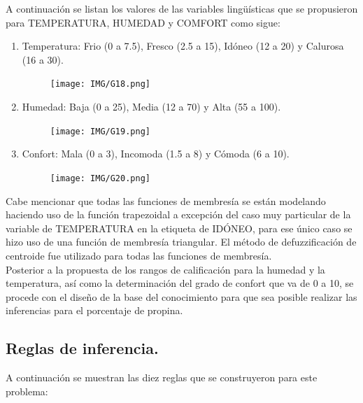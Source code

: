 \documentclass[11pt, letterpaper]{article}
\begin{document}
A continuación se listan los valores de las variables lingüísticas que se propusieron para TEMPERATURA, HUMEDAD y COMFORT como sigue:


\begin{enumerate}
	\item Temperatura: Frio (0 a 7.5), Fresco (2.5 a 15), Idóneo (12 a 20) y Calurosa (16 a 30).
	\begin{figure}[h]
		\centering
		\texttt{[image: IMG/G18.png]}
	\end{figure}
	
	\item Humedad: Baja (0 a 25), Media (12 a 70) y Alta (55 a 100).
	\begin{figure}[h]
		\centering
		\texttt{[image: IMG/G19.png]}
	\end{figure}
	\newpage
	\item Confort: Mala (0 a 3), Incomoda (1.5 a 8) y Cómoda (6 a 10).
	\begin{figure}[h]
		\centering
		\texttt{[image: IMG/G20.png]}
	\end{figure}
\end{enumerate}

Cabe mencionar que todas las funciones de membresía se están modelando haciendo uso de la función trapezoidal a excepción del caso muy particular de la variable de TEMPERATURA en la etiqueta de IDÓNEO, para ese único caso se hizo uso de una función de membresía triangular. El método de defuzzificación de centroide fue utilizado para todas las funciones de membresía. \\

Posterior a la propuesta de los rangos de calificación para la humedad y la temperatura, así como la determinación del grado de confort que va de 0 a 10, se procede con el diseño de la base del conocimiento para que sea posible realizar las inferencias para el porcentaje de propina.

\subsection{Reglas de inferencia.}

A continuación se muestran las diez reglas que se construyeron para este problema:
\end{document}
